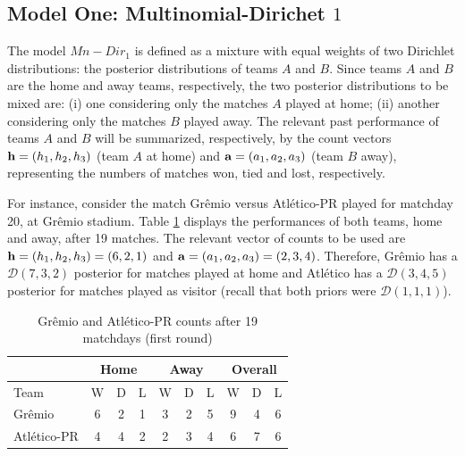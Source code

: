 \documentclass[journal,article,accept,moreauthors,pdftex,12pt,a4paper]{mdpi}
\begin{document}
	\subsection{Model One: Multinomial-Dirichet $1$}
	\label{sec::Mn_Dir1}
	
	The model $Mn-Dir_1$ is defined as a mixture with equal weights of two Dirichlet distributions: the posterior distributions of teams $A$ and $B$. 
	Since teams $A$ and $B$ are the home and away teams, respectively, the two posterior distributions to be mixed are: (i) one considering only the matches $A$ played at home; (ii) another considering only the matches $B$ played away. 
	The relevant past performance of teams $A$ and $B$ will be summarized, respectively, by the count vectors ${\bf h} = (h_1, h_2, h_3)$ (team $A$ at home) and ${\bf a} = (a_1, a_2, a_3)$ (team $B$ away), representing the numbers of matches won, tied and lost, respectively.
	
	For instance, consider the match Gr\^emio versus Atl\'etico-PR played for matchday 20, at Gr\^emio stadium. Table \ref{tab:counts} displays the performances of both teams, home and away, after 19
	matches. The relevant vector of counts to be used are ${\bf h}=(h_1,h_2,h_3)=(6,2,1)$ and ${\bf a}=(a_1,a_2,a_3)=(2,3,4)$. 
	Therefore, Gr\^emio has a $\mathcal{D}(7,3,2)$ posterior for matches played at home and Atl\'etico has a $\mathcal{D}(3,4,5)$ posterior for matches played as visitor (recall that both priors were
	$\mathcal{D}(1,1,1)$).
	
	\begin{table}[!h]
		\begin{center}
			\begin{tabular}{lccccccccc}
				
				\hline
				& \multicolumn{3}{c}{Home} & \multicolumn{3}{c}{Away}& \multicolumn{3}{c}{Overall} \\
				\hline
				\hline
				Team & W & D & L & W & D & L & W & D & L\\
				\hline
				Gr\^emio & 6 & 2 & 1 & 3 & 2 & 5 & 9 & 4 & 6\\
				Atl\'etico-PR & 4 & 4 & 2 & 2 & 3 & 4 & 6 & 7 & 6\\
				\hline
			\end{tabular}
			\caption{Gr\^emio and Atl\'etico-PR counts after 19 matchdays (first round)}\label{tab:counts}
		\end{center}
	\end{table}
	
\end{document}

